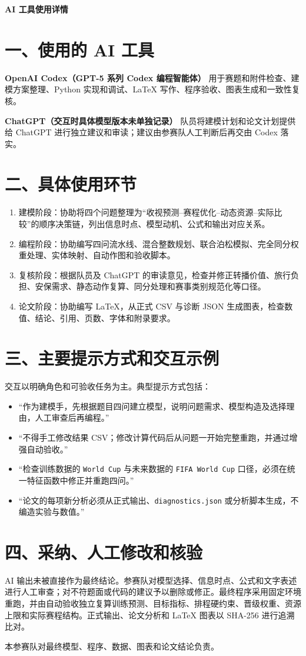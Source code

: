 \documentclass[UTF8,a4paper,11pt,fontset=none]{ctexart}
\begin{document}
\begin{center}
{\bfseries AI 工具使用详情}
\end{center}

\section*{一、使用的 AI 工具}

\noindent\textbf{OpenAI Codex（GPT-5 系列 Codex 编程智能体）}\quad
用于赛题和附件检查、建模方案整理、Python 实现和调试、LaTeX 写作、程序验收、图表生成和一致性复核。

\noindent\textbf{ChatGPT（交互时具体模型版本未单独记录）}\quad
队员将建模计划和论文计划提供给 ChatGPT 进行独立建议和审读；建议由参赛队人工判断后再交由 Codex 落实。

\section*{二、具体使用环节}

\begin{enumerate}[leftmargin=3em]
\item 建模阶段：协助将四个问题整理为“收视预测--赛程优化--动态资源--实际比较”的顺序决策链，列出信息时点、模型动机、公式和输出对应关系。
\item 编程阶段：协助编写四问流水线、混合整数规划、联合泊松模拟、完全同分权重处理、实体映射、自动作图和验收脚本。
\item 复核阶段：根据队员及 ChatGPT 的审读意见，检查并修正转播价值、旅行负担、安保需求、静态动作复算、同分处理和赛事类别规范化等口径。
\item 论文阶段：协助编写 LaTeX，从正式 CSV 与诊断 JSON 生成图表，检查数值、结论、引用、页数、字体和附录要求。
\end{enumerate}

\section*{三、主要提示方式和交互示例}

交互以明确角色和可验收任务为主。典型提示方式包括：

\begin{itemize}[leftmargin=3em]
\item “作为建模手，先根据题目四问建立模型，说明问题需求、模型构造及选择理由，人工审查后再编程。”
\item “不得手工修改结果 CSV；修改计算代码后从问题一开始完整重跑，并通过增强自动验收。”
\item “检查训练数据的 \texttt{World Cup} 与未来数据的 \texttt{FIFA World Cup} 口径，必须在统一特征函数中修正并重跑四问。”
\item “论文的每项新分析必须从正式输出、\texttt{diagnostics.json} 或分析脚本生成，不编造实验与数值。”
\end{itemize}

\section*{四、采纳、人工修改和核验}

AI 输出未被直接作为最终结论。参赛队对模型选择、信息时点、公式和文字表述进行人工审查；对不符题面或代码的建议予以删除或修正。最终程序采用固定环境重跑，并由自动验收独立复算训练预测、目标指标、排程硬约束、晋级权重、资源上限和实际赛程结构。正式输出、论文分析和 LaTeX 图表以 SHA-256 进行追溯比对。

本参赛队对最终模型、程序、数据、图表和论文结论负责。
\end{document}
